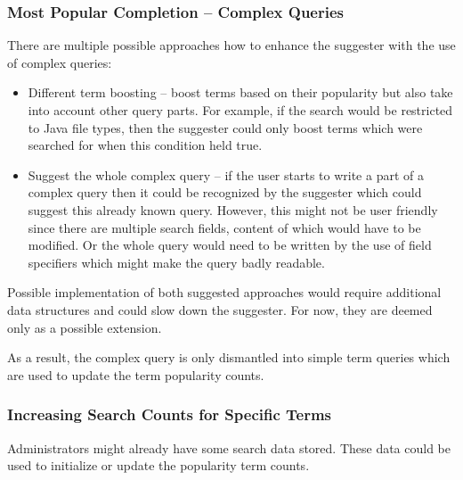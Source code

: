 \subsubsection{Most Popular Completion – Complex Queries}
\label{previous_searches}
There are multiple possible approaches how to enhance the suggester with the use of complex queries:
\begin{itemize}
    \item Different term boosting – boost terms based on their popularity but also take into account other
    query parts. For example, if the search would be restricted to Java file types, then the suggester could
    only boost terms which were searched for when this condition held true.
    \item Suggest the whole complex query – if the user starts to write a part of a complex query then it could be recognized
    by the suggester which could suggest this already known query. However, this might not be user friendly since there
    are multiple search fields, content of which would have to be modified. Or the whole query would need to be written by the
    use of field specifiers which might make the query badly readable.
\end{itemize}

Possible implementation of both suggested approaches would require additional data structures and could slow down the
suggester. For now, they are deemed only as a possible extension.

As a result, the complex query is only dismantled into simple term queries which are used to update the term popularity counts.

\subsubsection{Increasing Search Counts for Specific Terms}
\label{increasing_search_counts}
Administrators might already have some search data stored. These data could be used to initialize or update the
popularity term counts.

